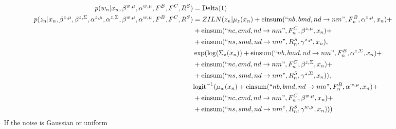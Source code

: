 \documentclass[a4paper]{article}
\begin{document}
\begin{align*}
    p(w_n|x_n, \beta^{w, \mu}, \alpha^{w,\mu}, F^B, F^C, R^S) &= \text{Delta}(1)\\
    p(z_n|x_n, \beta^{z, \mu}, \beta^{z, \Sigma}, \alpha^{z,\mu}, \alpha^{z,\Sigma},\beta^{w, \mu}, \alpha^{w,\mu}, F^B, F^C, R^S) &= ZILN(z_n|\mu_z(x_n) + \text{einsum}(``nb, bmd, nd \rightarrow nm",F^B_n, \alpha^{z, \mu}, x_n) + \\
                                                                                                                                   & + \text{einsum}(``nc, cmd, nd \rightarrow nm",F^C_n, \beta^{z, \mu}, x_n) + \\
                                                                                                                                   & + \text{einsum}(``ns, smd, nd \rightarrow nm",R^S_n, \gamma^{z, \mu}, x_n),\\
                                                                                                                                   & \exp(\log(\Sigma_z(x_n)) + \text{einsum}(``nb, bmd, nd \rightarrow nm",F^B_n, \alpha^{z, \Sigma}, x_n) + \\
                                                                                                                                   & + \text{einsum}(``nc, cmd, nd \rightarrow nm",F^C_n, \beta^{z, \Sigma}, x_n) + \\
                                                                                                                                   & + \text{einsum}(``ns, smd, nd \rightarrow nm",R^S_n, \gamma^{z, \Sigma}, x_n)), \\
                                                                                                                                   & \text{logit}^{-1}(\mu_w(x_n) + \text{einsum}(``nb, bmd, nd \rightarrow nm",F^B_n, \alpha^{w, \mu}, x_n) + \\
                                                                                                                                   & + \text{einsum}(``nc, cmd, nd \rightarrow nm",F^C_n, \beta^{w, \mu}, x_n) + \\
                                                                                                                                   & + \text{einsum}(``ns, smd, nd \rightarrow nm",R^S_n, \gamma^{w, \mu}, x_n)))
\end{align*}
If the noise is Gaussian or uniform
\end{document}
